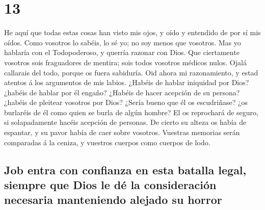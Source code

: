 \hypertarget{section-12}{%
\section{13}\label{section-12}}

 He aquí que todas estas cosas han visto mis ojos, y oído y
entendido de por sí mis oídos.  Como vosotros lo sabéis, lo
sé yo; no soy menos que vosotros.  Mas yo hablaría con el
Todopoderoso, y querría razonar con Dios.  Que ciertamente
vosotros sois fraguadores de mentira; sois todos vosotros médicos nulos.
 Ojalá callarais del todo, porque os fuera sabiduría.
 Oid ahora mi razonamiento, y estad atentos á los argumentos
de mis labios.  ¿Habéis de hablar iniquidad por Dios?
¿habéis de hablar por él engaño?  ¿Habéis de hacer acepción
de su persona? ¿habéis de pleitear vosotros por Dios? 
¿Sería bueno que él os escudriñase? ¿os burlaréis de él como quien se
burla de algún hombre?  El os reprochará de seguro, si
solapadamente hacéis acepción de personas.  De cierto su
alteza os había de espantar, y su pavor había de caer sobre vosotros.
 Vuestras memorias serán comparadas á la ceniza, y vuestros
cuerpos como cuerpos de lodo.

\hypertarget{job-entra-con-confianza-en-esta-batalla-legal-siempre-que-dios-le-duxe9-la-consideraciuxf3n-necesaria-manteniendo-alejado-su-horror}{%
\subsection{Job entra con confianza en esta batalla legal, siempre que
Dios le dé la consideración necesaria manteniendo alejado su
horror}\label{job-entra-con-confianza-en-esta-batalla-legal-siempre-que-dios-le-duxe9-la-consideraciuxf3n-necesaria-manteniendo-alejado-su-horror}}

